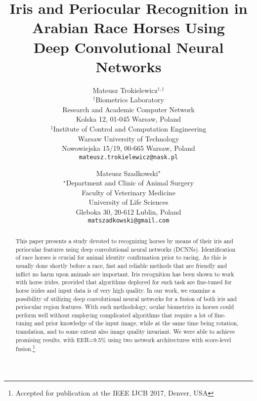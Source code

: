 \documentclass[10pt,twocolumn,letterpaper]{article}
\begin{document}
\title{Iris and Periocular Recognition in Arabian Race Horses Using\\ Deep Convolutional Neural Networks}

\author{Mateusz Trokielewicz$^{\dag,\ddag}$\\
$^{\dag}$Biometrics Laboratory\\
Research and Academic Computer Network\\
Kolska 12, 01-045 Warsaw, Poland\\
$^{\ddag}$Institute of Control and Computation Engineering\\
Warsaw University of Technology\\
Nowowiejska 15/19, 00-665 Warsaw, Poland\\
{\tt\small mateusz.trokielewicz@nask.pl}
\and
Mateusz Szadkowski$^{\star}$\\
$^{\star}$Department and Clinic of Animal Surgery\\
Faculty of Veterinary Medicine\\
University of Life Sciences\\
Gleboka 30, 20-612 Lublin, Poland\\
{\tt\small matszadkowski@gmail.com}
}

\maketitle
\thispagestyle{empty}


\begin{abstract}
This paper presents a study devoted to recognizing horses by means of their iris and periocular features using deep convolutional neural networks (DCNNs). Identification of race horses is crucial for animal identity confirmation prior to racing. As this is usually done shortly before a race, fast and reliable methods that are friendly and inflict no harm upon animals are important. Iris recognition has been shown to work with horse irides, provided that algorithms deployed for such task are fine-tuned for horse irides and input data is of very high quality. In our work, we examine a possibility of utilizing deep convolutional neural networks for a fusion of both iris and periocular region features. With such methodology, ocular biometrics in horses could perform well without employing complicated algorithms that require a lot of fine-tuning and prior knowledge of the input image, while at the same time being rotation, translation, and to some extent also image quality invariant. We were able to achieve promising results, with EER=9.5\% using two network architectures with score-level fusion.\let\thefootnote\relax\footnote{Accepted for publication at the IEEE IJCB 2017, Denver, USA}
\end{abstract}
\end{document}
